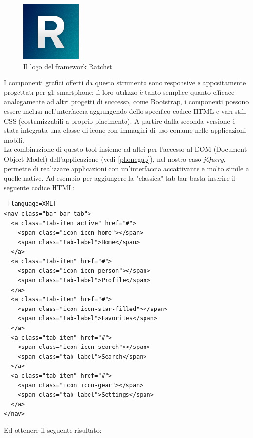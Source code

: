 \begin{figure}[H]
	\centering
	\includegraphics[scale=1]{Implementazione/ratchet_logo.png}
	\caption{Il logo del framework Ratchet}
	\label{fig:logo_ratchet}
\end{figure}

I componenti grafici offerti da questo strumento sono responsive e appositamente progettati per gli smartphone; il loro utilizzo è tanto semplice quanto efficace, analogamente ad altri progetti di successo, come Bootstrap, i componenti possono essere inclusi nell'interfaccia aggiungendo dello specifico codice HTML e vari stili CSS (costumizzabili a proprio piacimento). A partire dalla seconda versione è stata integrata una classe di icone con immagini di uso comune nelle applicazioni mobili.\\
La combinazione di questo tool insieme ad altri per l'accesso al DOM (Document Object Model) dell'applicazione (vedi \ref{phonegap}), nel nostro caso \textit{jQuery}, permette di realizzare applicazioni con un'interfaccia accattivante e molto simile a quelle native.
\newpage
Ad esempio per aggiungere la "classica" tab-bar basta inserire il seguente codice HTML:
\begin{lstlisting} [language=XML]
<nav class="bar bar-tab">
  <a class="tab-item active" href="#">
    <span class="icon icon-home"></span>
    <span class="tab-label">Home</span>
  </a>
  <a class="tab-item" href="#">
    <span class="icon icon-person"></span>
    <span class="tab-label">Profile</span>
  </a>
  <a class="tab-item" href="#">
    <span class="icon icon-star-filled"></span>
    <span class="tab-label">Favorites</span>
  </a>
  <a class="tab-item" href="#">
    <span class="icon icon-search"></span>
    <span class="tab-label">Search</span>
  </a>
  <a class="tab-item" href="#">
    <span class="icon icon-gear"></span>
    <span class="tab-label">Settings</span>
  </a>
</nav>
\end{lstlisting}
\newpage
Ed ottenere il seguente risultato:
